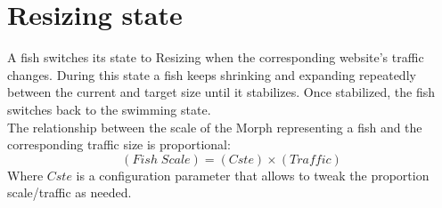 \section{Resizing state}
A fish switches its state to Resizing when the corresponding website's traffic changes. During this state a fish keeps shrinking and expanding repeatedly between the current and target size until it stabilizes. Once stabilized, the fish switches back to the swimming state.\\

The relationship between the scale of the Morph representing a fish and the corresponding traffic size is proportional:
\[(Fish\; Scale) = (Cste) \times (Traffic)\]
Where $Cste$ is a configuration parameter that allows to tweak the proportion scale/traffic as needed.

\newpage